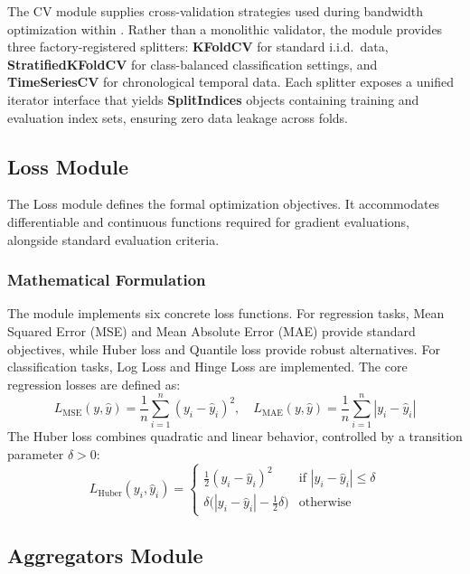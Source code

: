 \hs The CV module supplies cross-validation strategies used during bandwidth optimization within \GradientCOBRA{}. Rather than a monolithic validator, the module provides three factory-registered splitters: \textbf{KFoldCV} for standard i.i.d.\ data, \textbf{StratifiedKFoldCV} for class-balanced classification settings, and \textbf{TimeSeriesCV} for chronological temporal data. Each splitter exposes a unified iterator interface that yields \textbf{SplitIndices} objects containing training and evaluation index sets, ensuring zero data leakage across folds.

\subsection{Loss Module}
\label{subsec:loss_module}

\hs The Loss module defines the formal optimization objectives. It accommodates differentiable and continuous functions required for gradient evaluations, alongside standard evaluation criteria.

\subsubsection*{Mathematical Formulation}
The module implements six concrete loss functions. For regression tasks, Mean Squared Error (MSE) and Mean Absolute Error (MAE) provide standard objectives, while Huber loss and Quantile loss provide robust alternatives. For classification tasks, Log Loss and Hinge Loss are implemented. The core regression losses are defined as:
\[
    L_{\mathrm{MSE}}(y, \hat{y}) = \frac{1}{n}\sum_{i=1}^n (y_i - \hat{y}_i)^2, \quad
    L_{\mathrm{MAE}}(y, \hat{y}) = \frac{1}{n}\sum_{i=1}^n |y_i - \hat{y}_i|
\]
The Huber loss combines quadratic and linear behavior, controlled by a transition parameter $\delta > 0$:
\[
    L_{\mathrm{Huber}}(y_i, \hat{y}_i) =
    \begin{cases}
        \tfrac{1}{2}(y_i - \hat{y}_i)^2                          & \text{if } |y_i - \hat{y}_i| \le \delta \\
        \delta\bigl(|y_i - \hat{y}_i| - \tfrac{1}{2}\delta\bigr) & \text{otherwise}
    \end{cases}
\]

\subsection{Aggregators Module}
\label{subsec:aggregators_module}

